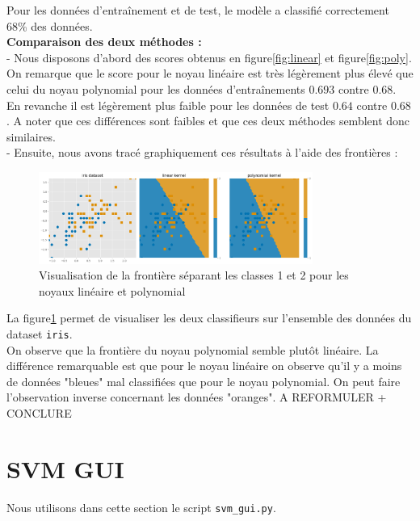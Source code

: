 \documentclass[a4paper,12pt]{article}
\begin{document}
Pour les données d'entraînement et de test, le modèle a classifié correctement 68\% des données. \\

\textbf{Comparaison des deux méthodes :}\\[0.5cm]
- Nous disposons d'abord des scores obtenus en figure\ref{fig:linear} et figure\ref{fig:poly}.
On remarque que le score pour le noyau linéaire est très légèrement plus élevé que celui du noyau polynomial pour les données d'entraînements $0.693$ contre $0.68$.
En revanche il est légèrement plus faible pour les données de test $0.64$ contre $0.68$. A noter que ces différences sont faibles et que ces deux méthodes semblent donc similaires.\\

- Ensuite, nous avons tracé graphiquement ces résultats à l'aide des frontières : \\
\begin{figure}[H]
    \centering
    \includegraphics[width=0.8\textwidth]{Images/linear_vs_poly.png}
    \caption{Visualisation de la frontière séparant les classes 1 et 2 pour les noyaux linéaire et polynomial}\label{fig:compare}
\end{figure}

La figure\ref{fig:compare} permet de visualiser les deux classifieurs sur l'ensemble des données du dataset \texttt{iris}.\\
On observe que la frontière du noyau polynomial semble plutôt linéaire.
La différence remarquable est que pour le noyau linéaire on observe qu'il y a moins de données "bleues" mal classifiées que pour le noyau polynomial.
On peut faire l'observation inverse concernant les données "oranges".
A REFORMULER + CONCLURE 

\newpage

\section{SVM GUI}

Nous utilisons dans cette section le script \texttt{svm\_gui.py}.
\end{document}
